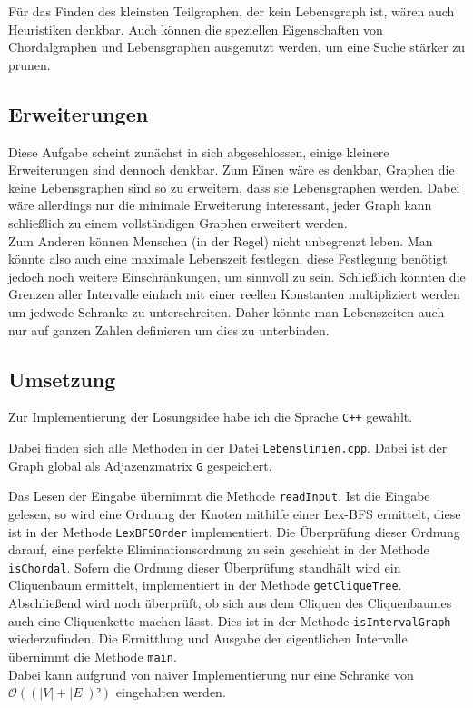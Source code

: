 Für das Finden des kleinsten Teilgraphen, der kein Lebensgraph ist, wären auch Heuristiken denkbar. Auch können die speziellen Eigenschaften von Chordalgraphen und Lebensgraphen ausgenutzt werden, um eine Suche stärker zu prunen.

\subsection{Erweiterungen}

Diese Aufgabe scheint zunächst in sich abgeschlossen, einige kleinere  Erweiterungen sind dennoch denkbar. Zum Einen wäre es denkbar, Graphen die keine Lebensgraphen sind so zu erweitern, dass sie Lebensgraphen werden. Dabei wäre allerdings nur die minimale Erweiterung interessant, jeder Graph kann schließlich zu einem vollständigen Graphen erweitert werden.\\
Zum Anderen können Menschen (in der Regel) nicht unbegrenzt leben. Man könnte also auch eine maximale Lebenszeit festlegen, diese Festlegung benötigt jedoch noch weitere Einschränkungen, um sinnvoll zu sein. Schließlich könnten die Grenzen aller Intervalle einfach mit einer reellen Konstanten multipliziert werden um jedwede Schranke zu unterschreiten. Daher könnte man Lebenszeiten auch nur auf ganzen Zahlen definieren um dies zu unterbinden.

\subsection{Umsetzung}

Zur Implementierung der Lösungsidee habe ich die Sprache \texttt{C++} gewählt.

Dabei finden sich alle Methoden in der Datei \texttt{Lebenslinien.cpp}. Dabei ist der Graph global als Adjazenzmatrix \texttt{G} gespeichert.

Das Lesen der Eingabe übernimmt die Methode \texttt{readInput}. Ist die Eingabe gelesen, so wird eine Ordnung der Knoten mithilfe einer Lex-BFS ermittelt, diese ist in der Methode \texttt{LexBFSOrder} implementiert. Die Überprüfung dieser Ordnung darauf, eine perfekte Eliminationsordnung zu sein geschieht in der Methode \texttt{isChordal}. Sofern die Ordnung dieser Überprüfung standhält wird ein Cliquenbaum ermittelt, implementiert in der Methode \texttt{getCliqueTree}. Abschließend wird noch überprüft, ob sich aus dem Cliquen des Cliquenbaumes auch eine Cliquenkette machen lässt. Dies ist in der Methode \texttt{isIntervalGraph} wiederzufinden. Die Ermittlung und Ausgabe der eigentlichen Intervalle übernimmt die Methode \texttt{main}.\\
Dabei kann aufgrund von naiver Implementierung nur eine Schranke von $\mathcal{O}((|V| + |E|)²)$ eingehalten werden.

